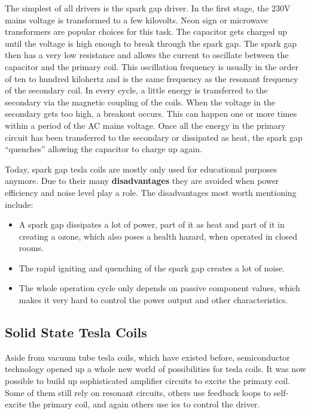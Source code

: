The simplest of all drivers is the spark gap driver. In the first stage, the 230V mains voltage is transformed to a few kilovolts. Neon sign or microwave transformers are popular choices for this task. The capacitor gets charged up until the voltage is high enough to break through the spark gap. The spark gap then has a very low resistance and allows the current to oscillate between the capacitor and the primary coil. This oscillation frequency is usually in the order of ten to hundred kilohertz and is the same frequency as the resonant frequency of the secondary coil. In every cycle, a little energy is transferred to the secondary via the magnetic coupling of the coils. When the voltage in the secondary gets too high, a breakout occurs. This can happen one or more times within a period of the AC mains voltage. Once all the energy in the primary circuit has been transferred to the secondary or dissipated as heat, the spark gap \enquote{quenches} allowing the capacitor to charge up again.

Today, spark gap tesla coils are mostly only used for educational purposes anymore. Due to their many \textbf{disadvantages} they are avoided when power efficiency and noise level play a role. The disadvantages most worth mentioning include:

\begin{itemize}
\item A spark gap dissipates a lot of power, part of it as heat and part of it in creating a ozone, which also poses a health hazard, when operated in closed rooms.
\item The rapid igniting and quenching of the spark gap creates a lot of noise.
\item The whole operation cycle only depends on passive component values, which makes it very hard to control the power output and other characteristics.
\end{itemize}

\subsection{Solid State Tesla Coils}

Aside from vacuum tube tesla coils, which have existed before, semiconductor technology opened up a whole new world of possibilities for tesla coils. It was now possible to build up sophisticated amplifier circuits to excite the primary coil. Some of them still rely on resonant circuits, others use feedback loops to self-excite the primary coil, and again others use \glspl{ic} to control the driver.

